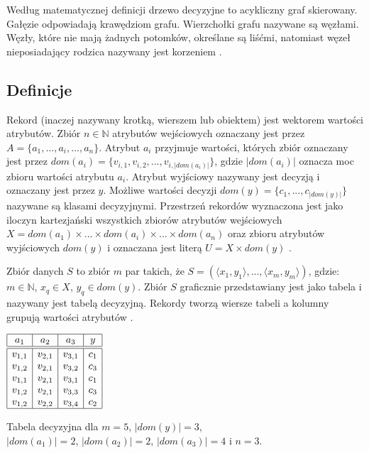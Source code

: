 \documentclass[12pt]{article}
\begin{document}
Według matematycznej definicji drzewo decyzyjne to acykliczny graf skierowany.
Gałęzie odpowiadają krawędziom grafu. Wierzchołki grafu nazywane są węzłami. Węzły, które
nie mają żadnych potomków, określane są liśćmi, natomiast węzeł nieposiadający rodzica
nazywany jest korzeniem \cite{algorytmy-do-konstruowania-drzew-decyzyjnych}.

\subsection{Definicje}
Rekord (inaczej nazywany krotką, wierszem lub obiektem) jest wektorem wartości atrybutów.
Zbiór $n \in \mathbb{N}$ atrybutów wejściowych oznaczany jest przez $A = \{a_1, ..., a_i, ..., a_n\}$.
Atrybut $a_i$ przyjmuje wartości, których zbiór oznaczany jest przez
$dom(a_i) = \{v_{i,1}, v_{i,2}, ..., v_{i,|dom(a_i)|}\}$,
gdzie $|dom(a_i)|$ oznacza moc zbioru wartości atrybutu $a_i$. Atrybut wyjściowy nazywany
jest decyzją i oznaczany jest przez $y$. Możliwe wartości decyzji $dom(y) = \{c_1, ..., c_{|dom(y)|}\}$
nazywane są klasami decyzyjnymi. Przestrzeń rekordów wyznaczona jest jako iloczyn kartezjański
wszystkich zbiorów atrybutów wejściowych $X = dom(a_1) \times ... \times dom(a_i) \times ... \times dom(a_n)$
oraz zbioru atrybutów wyjściowych $dom(y)$ i oznaczana jest literą $U = X \times dom(y)$ \cite{data-mining-with-decision-trees}.

Zbiór danych $S$ to zbiór $m$ par takich, że $S = (\langle x_1, y_1\rangle, ..., \langle x_m, y_m\rangle)$,
gdzie: $m \in \mathbb{N} $, $x_q \in X$, $y_q \in dom(y)$. Zbiór $S$ graficznie przedstawiany jest jako tabela
i nazywany jest tabelą decyzyjną. Rekordy tworzą wiersze tabeli a kolumny grupują wartości atrybutów \cite{data-mining-with-decision-trees}.

\begin{table}[H]
    \centering
    $\begin{array}{|c|c|c|c|}
        \hline 
        a_1 & a_2 & a_3 & y \\
        \hline \hline
        v_{1,1} & v_{2,1} & v_{3,1} & c_1 \\
        v_{1,2} & v_{2,1} & v_{3,2} & c_3 \\
        v_{1,1} & v_{2,1} & v_{3,1} & c_1 \\
        v_{1,2} & v_{2,1} & v_{3,3} & c_3 \\
        v_{1,2} & v_{2,2} & v_{3,4} & c_2 \\
        \hline
    \end{array}$
    \caption{\label{tab:decision-table}Tabela decyzyjna dla $m=5$, $|dom(y)|=3$,\\ $|dom(a_1)|=2$, $|dom(a_2)|=2$, $|dom(a_3)|=4$ i $n=3$.}
\end{table}
\end{document}
